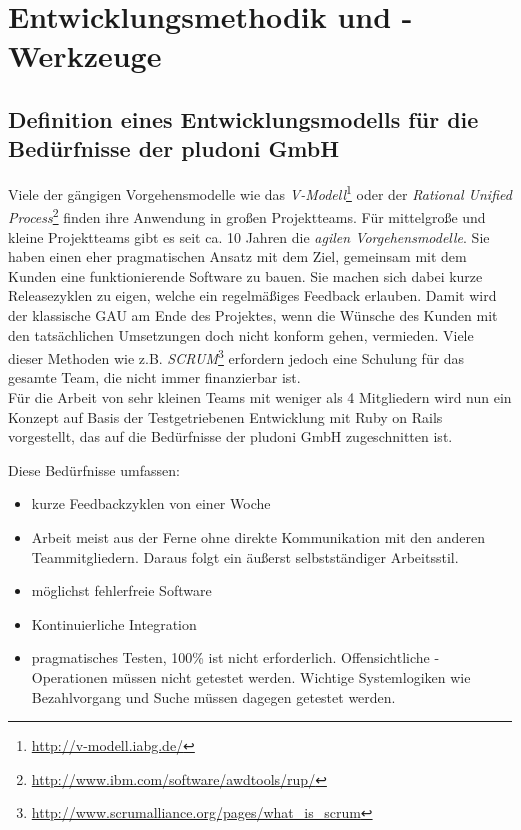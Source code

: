 \chapter{Entwicklungsmethodik und -Werkzeuge}
\label{sec:auswahl}
\section{Definition eines Entwicklungsmodells für die Bedürfnisse der pludoni GmbH}
Viele der gängigen Vorgehensmodelle wie das \textit{V-Modell}\footnote{\url{http://v-modell.iabg.de/}} oder der \textit{Rational Unified Process}\footnote{\url{http://www.ibm.com/software/awdtools/rup/}} finden ihre Anwendung in großen Projektteams. Für mittelgroße und kleine Projektteams gibt es seit ca. 10 Jahren die \textit{agilen Vorgehensmodelle}. Sie haben einen eher pragmatischen Ansatz mit dem Ziel, gemeinsam mit dem Kunden eine funktionierende Software zu bauen. Sie machen sich dabei kurze Releasezyklen zu eigen, welche ein regelmäßiges Feedback erlauben. Damit wird der klassische GAU am Ende des Projektes, wenn die Wünsche des Kunden mit den tatsächlichen Umsetzungen doch nicht konform gehen, vermieden. Viele dieser Methoden wie z.B. \textit{SCRUM}\footnote{\url{http://www.scrumalliance.org/pages/what_is_scrum}} erfordern jedoch eine Schulung für das gesamte Team, die nicht immer finanzierbar ist.\\
Für die Arbeit von sehr kleinen Teams mit weniger als 4 Mitgliedern wird nun ein Konzept auf Basis der Testgetriebenen Entwicklung mit Ruby on Rails vorgestellt, das auf die Bedürfnisse der pludoni GmbH zugeschnitten ist.

Diese Bedürfnisse umfassen:
\begin{itemize}
 \item kurze Feedbackzyklen von einer Woche
 \item Arbeit meist aus der Ferne ohne direkte Kommunikation mit den anderen Teammitgliedern. Daraus folgt ein äußerst selbstständiger Arbeitsstil.
 \item möglichst fehlerfreie Software
 \item Kontinuierliche Integration
 \item pragmatisches Testen, 100\%  ist nicht erforderlich. Offensichtliche -Operationen müssen nicht getestet werden.  Wichtige Systemlogiken wie Bezahlvorgang und Suche müssen dagegen getestet werden.
\end{itemize}

